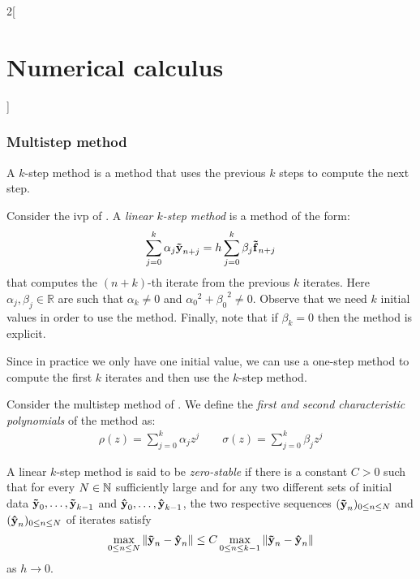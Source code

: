 \documentclass[../../../main_math.tex]{subfiles}
\begin{document}
\begin{multicols}{2}[\section{Numerical calculus}]
  \subsubsection{Multistep method}
  \begin{definition}
    A $k$-step method is a method that uses the previous $k$ steps to compute the next step.
  \end{definition}
  \begin{definition}
    Consider the ivp of . A \emph{linear $k$-step method} is a method of the form:
    \begin{equation}\label{NC:multistep}
      \sum_{j=0}^k\alpha_j\boldsymbol{\mathrm{\tilde{y}}}_{n+j}=h\sum_{j=0}^{k}\beta_j\boldsymbol{\mathrm{\tilde{f}}}_{n+j}
    \end{equation}
    that computes the $(n+k)$-th iterate from the previous $k$ iterates. Here $\alpha_j,\beta_j\in\mathbb{R}$ are such that $\alpha_k\ne 0$ and ${\alpha_0}^2+{\beta_0}^2\ne 0$. Observe that we need $k$ initial values in order to use the method. Finally, note that if $\beta_k=0$ then the method is explicit.
  \end{definition}
  \begin{remark}
    Since in practice we only have one initial value, we can use a one-step method to compute the first $k$ iterates and then use the $k$-step method.
  \end{remark}
  \begin{definition}
    Consider the multistep method of . We define the \emph{first and second characteristic polynomials} of the method as:
    \begin{gather*}
      \rho(z) =\sum_{j=0}^k\alpha_jz^j                  \qquad
      \sigma (z) =\sum_{j=0}^k\beta_jz^j
    \end{gather*}
  \end{definition}
  \begin{definition}
    A linear $k$-step method is said to be \emph{zero-stable} if there is a constant $C>0$ such that for every $N\in\mathbb{N}$ sufficiently large and for any two different sets of initial data $\boldsymbol{\mathrm{\tilde{y}}}_0,\ldots,\boldsymbol{\mathrm{\tilde{y}}}_{k-1}$ and $\boldsymbol{\mathrm{\hat{y}}}_0,\ldots,\boldsymbol{\mathrm{\hat{y}}}_{k-1}$, the two respective sequences $(\boldsymbol{\mathrm{\tilde{y}}}_n)_{0\leq n\leq N}$ and $(\boldsymbol{\mathrm{\hat{y}}}_n)_{0\leq n\leq N}$ of iterates satisfy
    $$\max_{0\leq n\leq N}\left\|\boldsymbol{\mathrm{\tilde{y}}}_n-\boldsymbol{\mathrm{\hat{y}}}_n\right\|\leq C\max_{0\leq n\leq k-1}\left\|\boldsymbol{\mathrm{\tilde{y}}}_n-\boldsymbol{\mathrm{\hat{y}}}_n\right\|$$
    as $h\to 0$.
  \end{definition}

\end{multicols}
\end{document}
